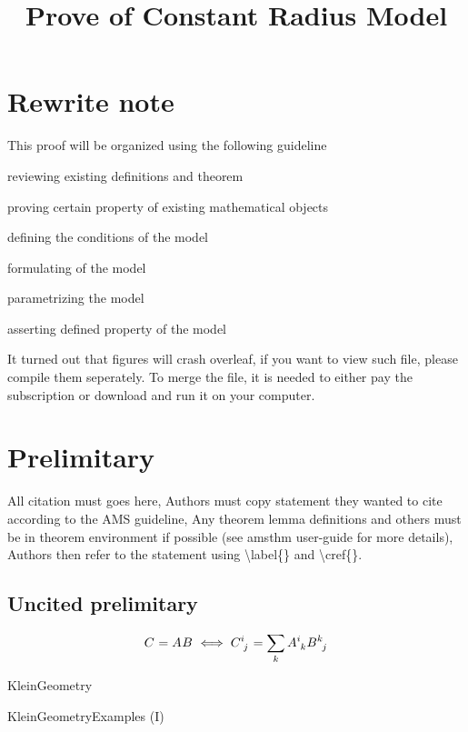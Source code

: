 \documentclass[stu, babel, american, biblatex, a4paper, draftall]{apa7}
\title{Prove of Constant Radius Model}
\begin{document}
\maketitle
\tableofcontents

\section{Rewrite note}
This proof will be organized using the following guideline
\begin{APAenumerate}
    \item reviewing existing definitions and theorem
    \item proving certain property of existing mathematical objects
    \item defining the conditions of the model
    \item formulating of the model
    \item parametrizing the model
    \item asserting defined property of the model
\end{APAenumerate}
It turned out that figures will crash overleaf, if you want to view such file, please compile them seperately.
To merge the file, it is needed to either pay the subscription or download and run it on your computer.

\section{Prelimitary}
All citation must goes here,
Authors must copy statement they wanted to cite according to the AMS guideline,
Any theorem lemma definitions and others must be in theorem environment if possible (see amsthm user-guide for more details),
Authors then refer to the statement using {\textbackslash}label\{\} and {\textbackslash}cref\{\}.
\subsection{Uncited prelimitary}
\begin{equation}\label{MatrixMultiplication}
    \tensor{C}{}=\tensor{A}{}\tensor{B}{}
    \iff
    \tensor{C}{^i_j}=\sum_k\tensor{A}{^i_k}\tensor{B}{^k_j}
\end{equation}
\begin{definition}\label{KleinGeometry}
    KleinGeometry
\end{definition}
\begin{example}\label{KleinGeometryExample}
    KleinGeometryExamples (I)
\end{example}
\end{document}
